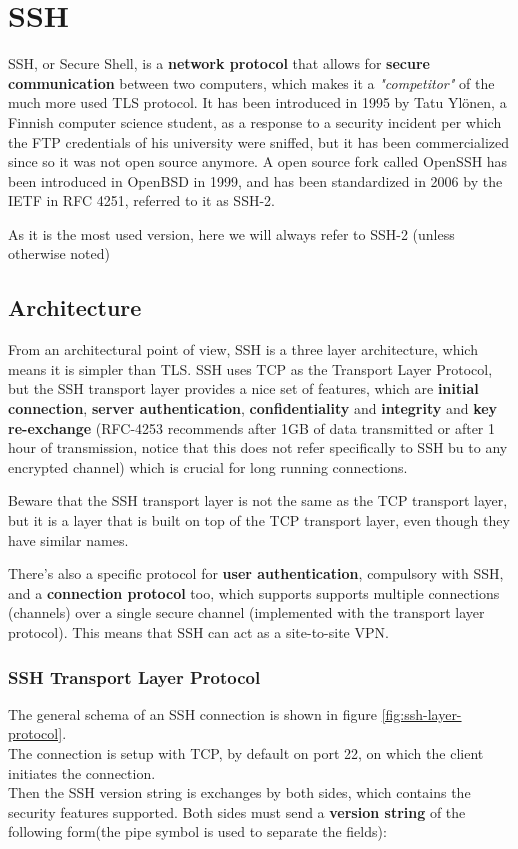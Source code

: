 \chapter{SSH}
SSH, or Secure Shell, is a \textbf{network protocol} that allows for
\textbf{secure communication} between two computers, which makes it a
\textit{"competitor"} of the much more used TLS protocol. It has been
introduced in 1995 by Tatu Ylönen, a Finnish computer science student,
as a response to a security incident per which the FTP credentials of 
his university were sniffed, but it has been commercialized since so
it was not open source anymore. A open source fork called OpenSSH has
been introduced in OpenBSD in 1999, and has been standardized in 2006
by the IETF in RFC 4251, referred to it as SSH-2.
\begin{boxH}
  As it is the most used version, here we will always refer to SSH-2
  (unless otherwise noted)
\end{boxH}

\section{Architecture}
From an architectural point of view, SSH is a three layer
architecture, which means it is simpler than TLS. SSH uses TCP as the
Transport Layer Protocol, but the SSH transport layer provides a nice
set of features, which are \textbf{initial connection}, \textbf{server
authentication}, \textbf{confidentiality} and \textbf{integrity} and
\textbf{key re-exchange} (RFC-4253 recommends after 1GB of data
transmitted or after 1 hour of transmission, notice that this does not
refer specifically to SSH bu to  any encrypted channel) which is
crucial for long running connections.
\begin{boxH}
  Beware that the SSH transport layer is not the same as the TCP
  transport layer, but it is a layer that is built on top of the TCP 
  transport layer, even though they have similar names.
\end{boxH}
There's also a specific protocol for \textbf{user authentication},
compulsory with SSH, and a \textbf{connection protocol} too, which
supports supports multiple connections (channels) over a single secure
channel (implemented with the transport layer protocol). This means
that SSH can act as a site-to-site VPN.
\subsection{SSH Transport Layer Protocol}
The general schema of an SSH connection is shown in figure
\ref{fig:ssh-layer-protocol}.\\
The connection is setup with TCP, by default on port 22, on which the
client initiates the connection.\\
Then the SSH version string is exchanges by both sides, which contains
the security features supported. Both sides must send a
\textbf{version string} of the following form(the pipe symbol is used
to separate the fields): 

